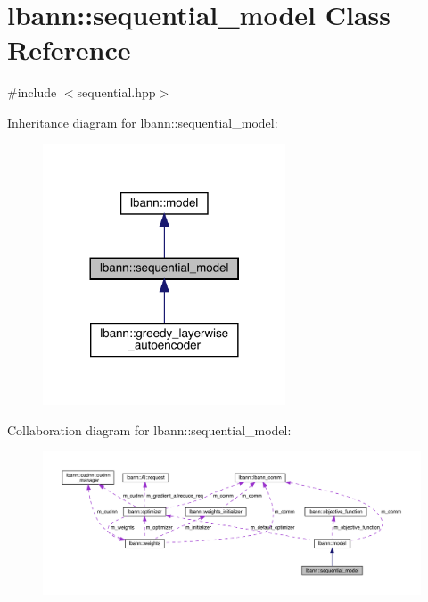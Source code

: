 \hypertarget{classlbann_1_1sequential__model}{}\section{lbann\+:\+:sequential\+\_\+model Class Reference}
\label{classlbann_1_1sequential__model}


{\ttfamily \#include $<$sequential.\+hpp$>$}



Inheritance diagram for lbann\+:\+:sequential\+\_\+model\+:\nopagebreak
\begin{figure}[H]
\begin{center}
\leavevmode
\includegraphics[width=204pt]{classlbann_1_1sequential__model__inherit__graph}
\end{center}
\end{figure}


Collaboration diagram for lbann\+:\+:sequential\+\_\+model\+:\nopagebreak
\begin{figure}[H]
\begin{center}
\leavevmode
\includegraphics[width=350pt]{classlbann_1_1sequential__model__coll__graph}
\end{center}
\end{figure}
